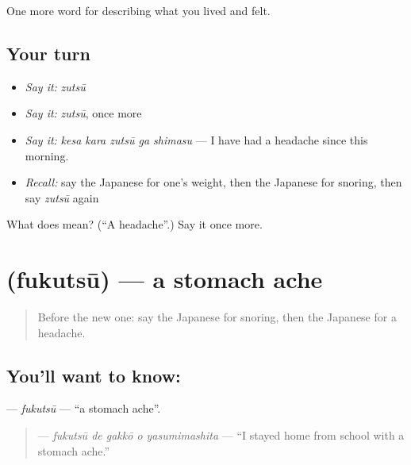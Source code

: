 \begin{grammarlens}[title={What you've built}]
One more word for describing what you lived and felt.
\end{grammarlens}

\subsection*{Your turn}
\begin{itemize}
\raggedright
  \item \emph{Say it:} \emph{zutsū}
  \item \emph{Say it:} \emph{zutsū}, once more
  \item \emph{Say it:} \emph{kesa kara zutsū ga shimasu} — I have had a headache since this morning.
  \item \emph{Recall:} say the Japanese for one's weight, then the Japanese for snoring, then say \emph{zutsū} again
\end{itemize}

\begin{tcolorbox}[breakable,colback=teal!4,colframe=teal!35!black,title={Before you move on}]
What does  mean? (\textquotedblleft{}A headache\textquotedblright{}.) Say it once more.
\end{tcolorbox}
\section[\texorpdfstring{\ja{ふくつう} (fukutsū)}{ふくつう (fukutsū)}]{ (fukutsū) — a stomach ache}

\label{lesson:JA-C445-fukutsuu}



\begin{quote}
Before the new one: say the Japanese for snoring, then the Japanese for a headache.
\end{quote}

\subsection*{You'll want to know: }
\textbf{} — \emph{fukutsū} — \textquotedblleft{}a stomach ache\textquotedblright{}.

\begin{quote}
\textbf{  } — \emph{fukutsū de gakkō o yasumimashita} — \textquotedblleft{}I stayed home from school with a stomach ache.\textquotedblright{}
\end{quote}

